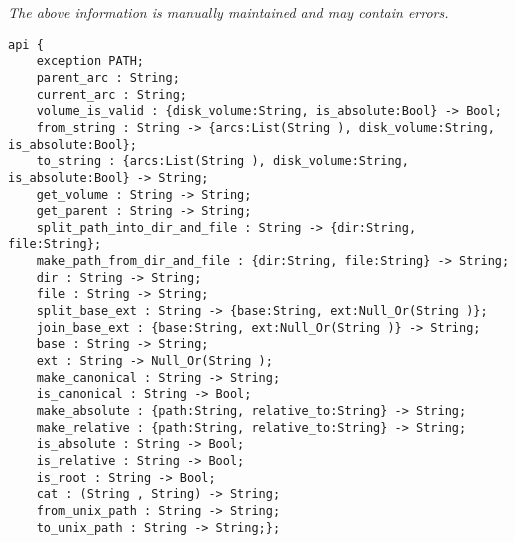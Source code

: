 \label{api:Winix\_Path}

{\tiny \it The above information is manually maintained and may contain errors.}
\begin{verbatim}
api {
    exception PATH;
    parent_arc : String;
    current_arc : String;
    volume_is_valid : {disk_volume:String, is_absolute:Bool} -> Bool;
    from_string : String -> {arcs:List(String ), disk_volume:String, is_absolute:Bool};
    to_string : {arcs:List(String ), disk_volume:String, is_absolute:Bool} -> String;
    get_volume : String -> String;
    get_parent : String -> String;
    split_path_into_dir_and_file : String -> {dir:String, file:String};
    make_path_from_dir_and_file : {dir:String, file:String} -> String;
    dir : String -> String;
    file : String -> String;
    split_base_ext : String -> {base:String, ext:Null_Or(String )};
    join_base_ext : {base:String, ext:Null_Or(String )} -> String;
    base : String -> String;
    ext : String -> Null_Or(String );
    make_canonical : String -> String;
    is_canonical : String -> Bool;
    make_absolute : {path:String, relative_to:String} -> String;
    make_relative : {path:String, relative_to:String} -> String;
    is_absolute : String -> Bool;
    is_relative : String -> Bool;
    is_root : String -> Bool;
    cat : (String , String) -> String;
    from_unix_path : String -> String;
    to_unix_path : String -> String;};
\end{verbatim}
